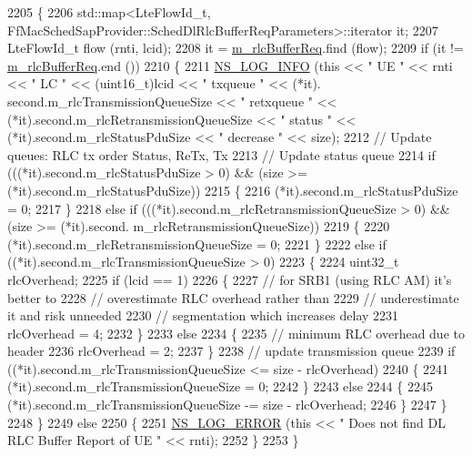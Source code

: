 \begin{DoxyCode}
2205 \{
2206   std::map<LteFlowId\_t, FfMacSchedSapProvider::SchedDlRlcBufferReqParameters>::iterator it;
2207   LteFlowId\_t flow (rnti, lcid);
2208   it = \hyperlink{classns3_1_1PfFfMacScheduler_aaad15dd674acb600fb8dc9263fcfa2bc}{m\_rlcBufferReq}.find (flow);
2209   \textcolor{keywordflow}{if} (it != \hyperlink{classns3_1_1PfFfMacScheduler_aaad15dd674acb600fb8dc9263fcfa2bc}{m\_rlcBufferReq}.end ())
2210     \{
2211       \hyperlink{group__logging_gafbd73ee2cf9f26b319f49086d8e860fb}{NS\_LOG\_INFO} (\textcolor{keyword}{this} << \textcolor{stringliteral}{" UE "} << rnti << \textcolor{stringliteral}{" LC "} << (uint16\_t)lcid << \textcolor{stringliteral}{" txqueue "} << (*it).
      second.m\_rlcTransmissionQueueSize << \textcolor{stringliteral}{" retxqueue "} << (*it).second.m\_rlcRetransmissionQueueSize << \textcolor{stringliteral}{" status "} 
      << (*it).second.m\_rlcStatusPduSize << \textcolor{stringliteral}{" decrease "} << size);
2212       \textcolor{comment}{// Update queues: RLC tx order Status, ReTx, Tx}
2213       \textcolor{comment}{// Update status queue}
2214       \textcolor{keywordflow}{if} (((*it).second.m\_rlcStatusPduSize > 0) && (size >= (*it).second.m\_rlcStatusPduSize))
2215         \{
2216           (*it).second.m\_rlcStatusPduSize = 0;
2217         \}
2218       \textcolor{keywordflow}{else} \textcolor{keywordflow}{if} (((*it).second.m\_rlcRetransmissionQueueSize > 0) && (size >= (*it).second.
      m\_rlcRetransmissionQueueSize))
2219         \{
2220           (*it).second.m\_rlcRetransmissionQueueSize = 0;
2221         \}
2222       \textcolor{keywordflow}{else} \textcolor{keywordflow}{if} ((*it).second.m\_rlcTransmissionQueueSize > 0)
2223         \{
2224           uint32\_t rlcOverhead;
2225           \textcolor{keywordflow}{if} (lcid == 1)
2226             \{
2227               \textcolor{comment}{// for SRB1 (using RLC AM) it's better to}
2228               \textcolor{comment}{// overestimate RLC overhead rather than}
2229               \textcolor{comment}{// underestimate it and risk unneeded}
2230               \textcolor{comment}{// segmentation which increases delay }
2231               rlcOverhead = 4;
2232             \}
2233           \textcolor{keywordflow}{else}
2234             \{
2235               \textcolor{comment}{// minimum RLC overhead due to header}
2236               rlcOverhead = 2;
2237             \}
2238           \textcolor{comment}{// update transmission queue}
2239           \textcolor{keywordflow}{if} ((*it).second.m\_rlcTransmissionQueueSize <= size - rlcOverhead)
2240             \{
2241               (*it).second.m\_rlcTransmissionQueueSize = 0;
2242             \}
2243           \textcolor{keywordflow}{else}
2244             \{
2245               (*it).second.m\_rlcTransmissionQueueSize -= size - rlcOverhead;
2246             \}
2247         \}
2248     \}
2249   \textcolor{keywordflow}{else}
2250     \{
2251       \hyperlink{group__logging_ga0261a8db1d4ac5f79417d117634fd455}{NS\_LOG\_ERROR} (\textcolor{keyword}{this} << \textcolor{stringliteral}{" Does not find DL RLC Buffer Report of UE "} << rnti);
2252     \}
2253 \}
\end{DoxyCode}



